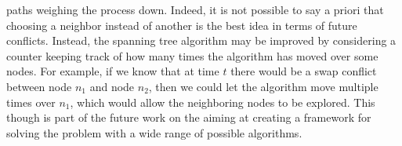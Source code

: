 paths weighing the process down. Indeed, it is not possible to say a priori
that choosing a neighbor instead of another is the best idea in terms of future
conflicts. \newline
Instead, the spanning tree algorithm may be improved by considering a counter
keeping track of how many times the algorithm has moved over some nodes. For
example, if we know that at time $t$ there would be a swap conflict between
node $n_1$ and node $n_2$, then we could let the algorithm move multiple times
over $n_1$, which would allow the neighboring nodes to be explored. \newline
This though is part of the future work on the  aiming at creating a
framework for solving the problem with a wide range of possible algorithms. 

